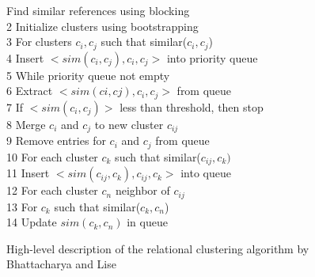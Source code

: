 \begin{figure}[H]
  \hspace{4ex} Find similar references using blocking\\
2 \hspace{5ex}Initialize clusters using bootstrapping\\
3 \hspace{5ex}For clusters $c_i,c_j$ such that similar($c_i,c_j$)\\
4 \hspace{10ex}Insert $<sim(c_i,c_j),c_i,c_j>$ into priority queue\\
5 \hspace{5ex}While priority queue not empty\\
6 \hspace{10ex}Extract $<sim(ci,cj),c_i,c_j>$ from queue\\
7 \hspace{10ex}If $<sim(c_i,c_j)>$ less than threshold, then stop\\
8 \hspace{10ex}Merge $c_i$ and $c_j$ to new cluster $c_{ij}$\\
9 \hspace{10ex}Remove entries for $c_i$ and $c_j$ from queue\\
10 \hspace{9ex}For each cluster $c_k$ such that similar($c_{ij},c_k)$\\
11 \hspace{20ex}Insert $<sim(c_{ij},c_k),c_{ij},c_k>$ into queue\\
12 \hspace{9ex}For each cluster $c_n$ neighbor of $c_{ij}$\\
13 \hspace{20ex}For $c_k$ such that similar($c_k,c_n$)\\
14 \hspace{28ex}Update $sim(c_k,c_n)$ in queue\\
\caption{High-level description of the relational clustering algorithm by Bhattacharya and Lise \cite{BhGe07}}
\label{fig:RC}
\end{figure} 

